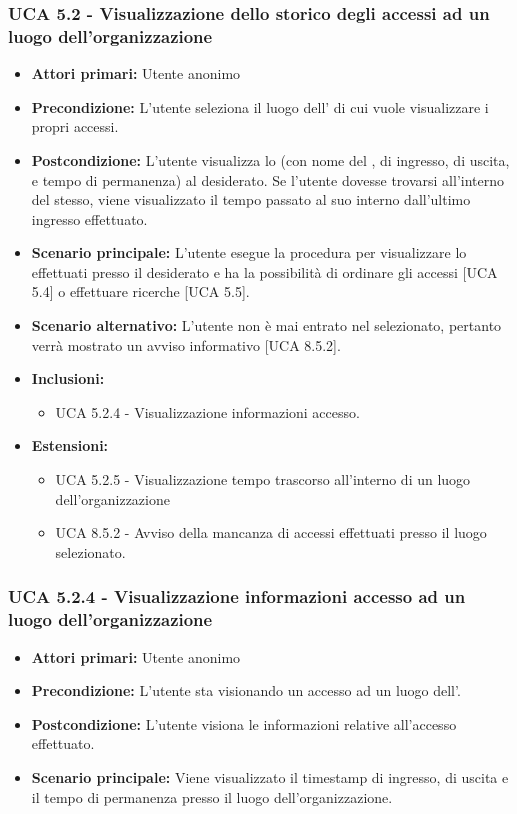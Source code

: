 \subsubsection{UCA 5.2 - Visualizzazione dello storico degli accessi ad un luogo dell'organizzazione}
\begin{itemize}
    \item \textbf{Attori primari:} Utente anonimo
    \item \textbf{Precondizione:} L'utente seleziona il luogo dell' di cui vuole visualizzare i propri accessi.
    \item \textbf{Postcondizione:} L'utente visualizza lo  (con nome del ,  di ingresso, di uscita, e tempo di permanenza) al  desiderato. Se l'utente dovesse trovarsi all'interno del  stesso, viene visualizzato il tempo passato al suo interno dall'ultimo ingresso effettuato.
    \item \textbf{Scenario principale:} L'utente esegue la procedura per visualizzare lo  effettuati presso il  desiderato e ha la possibilità di ordinare gli accessi [UCA 5.4] o effettuare ricerche [UCA 5.5].
    \item \textbf{Scenario alternativo:} L'utente non è mai entrato nel  selezionato, pertanto verrà mostrato un avviso informativo [UCA 8.5.2].
    \item \textbf{Inclusioni:}
    \begin{itemize}
        \item UCA 5.2.4 - Visualizzazione informazioni accesso.
    \end{itemize}
    \item \textbf{Estensioni:}
    \begin{itemize}
        \item UCA 5.2.5 - Visualizzazione tempo trascorso all'interno di un luogo dell'organizzazione
        \item UCA 8.5.2 - Avviso della mancanza di accessi effettuati presso il luogo selezionato.
    \end{itemize}
\end{itemize}

\subsubsection{UCA 5.2.4 - Visualizzazione informazioni accesso ad un luogo dell'organizzazione}
\begin{itemize}
	\item \textbf{Attori primari:} Utente anonimo
	\item \textbf{Precondizione:} L'utente sta visionando un accesso ad un luogo dell'.
	\item \textbf{Postcondizione:} L'utente visiona le informazioni relative all'accesso effettuato.
	\item \textbf{Scenario principale:} Viene visualizzato il timestamp di ingresso, di uscita e il tempo di permanenza presso il luogo dell'organizzazione.
\end{itemize}

